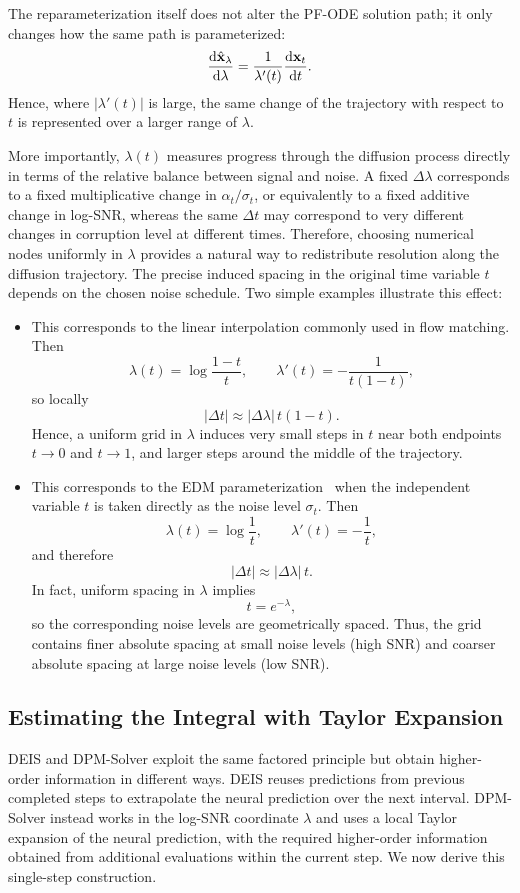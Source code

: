 The reparameterization itself does not alter the PF-ODE solution path; it only
changes how the same path is parameterized:
\[
\frac{\mathop{}\!\mathrm{d} \hat{{\mathbf{x}}}_\lambda}{\mathop{}\!\mathrm{d} \lambda}
=
\frac{1}{\lambda'(t)}
\frac{\mathop{}\!\mathrm{d} {\mathbf{x}}_t}{\mathop{}\!\mathrm{d} t}.
\]
Hence, where $|\lambda'(t)|$ is large, the same change of the trajectory with
respect to $t$ is represented over a larger range of $\lambda$.

More importantly, $\lambda(t)$ measures progress through the diffusion process
directly in terms of the relative balance between signal and noise. A fixed
$\Delta\lambda$ corresponds to a fixed multiplicative change in
$\alpha_t/\sigma_t$, or equivalently to a fixed additive change in log-SNR,
whereas the same $\Delta t$ may correspond to very different changes in
corruption level at different times. Therefore, choosing numerical nodes
uniformly in $\lambda$ provides a natural way to redistribute resolution along
the diffusion trajectory. The precise induced spacing in the original time
variable $t$ depends on the chosen noise schedule. Two simple examples
illustrate this effect:

\begin{itemize}
\item {}
This corresponds to the linear interpolation commonly used in flow matching.
Then
\[
\lambda(t)
=
\log\frac{1-t}{t},
\qquad
\lambda'(t)
=
-\frac{1}{t(1-t)},
\]
so locally
\[
|\Delta t|
\approx
|\Delta\lambda|\,t(1-t).
\]
Hence, a uniform grid in $\lambda$ induces very small steps in $t$ near both
endpoints $t\to0$ and $t\to1$, and larger steps around the middle of the
trajectory.

\item {}
This corresponds to the EDM parameterization~\citep{karras2022elucidating}
when the independent variable $t$ is taken directly as the noise level
$\sigma_t$. Then
\[
\lambda(t)
=
\log\frac{1}{t},
\qquad
\lambda'(t)
=
-\frac{1}{t},
\]
and therefore
\[
|\Delta t|
\approx
|\Delta\lambda|\,t.
\]
In fact, uniform spacing in $\lambda$ implies
\[
t=e^{-\lambda},
\]
so the corresponding noise levels are geometrically spaced. Thus, the grid
contains finer absolute spacing at small noise levels (high SNR) and coarser
absolute spacing at large noise levels (low SNR).
\end{itemize}



\subsection{Estimating the Integral with Taylor Expansion}\label{subsec:dpm-method-2} 
DEIS and DPM-Solver exploit the same factored principle but obtain
higher-order information in different ways. DEIS reuses predictions from
previous completed steps to extrapolate the neural prediction over the next
interval. DPM-Solver instead works in the log-SNR coordinate $\lambda$ and
uses a local Taylor expansion of the neural prediction, with the required
higher-order information obtained from additional evaluations within the
current step. We now derive this single-step construction.

